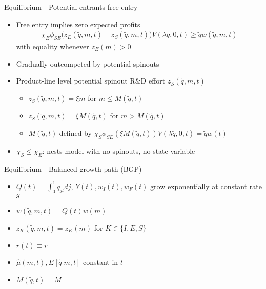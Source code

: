\documentclass[english,usenames,dvipsnames]{beamer}
\begin{document}
\begin{frame}{Equilibrium - Potential entrants free entry}
\begin{itemize}
	\item Free entry implies zero expected profits
	\begin{align*}
		\chi_E \phi_{SE}\Big(z_E(\tilde{q},m,t) + z_S(\tilde{q},m,t)\Big) V(\lambda q,0,t) \ge \tilde{q} w(\tilde{q},m,t)
	\end{align*} 
	with equality whenever $z_E(m) > 0$
	\item Gradually outcompeted by potential spinouts
	\item Product-line level potential spinout R\&D effort $z_S(\tilde{q},m,t)$
	\begin{itemize}
		\item $z_S(\tilde{q},m,t) = \xi m$ for $m \le M(\tilde{q},t)$
		\item $z_S(\tilde{q},m,t) = \xi M(\tilde{q},t)$ for $m > M(\tilde{q},t)$
		\item $M(\tilde{q},t)$ defined by $\chi_S \phi_{SE} (\xi M(\tilde{q},t)) V(\lambda \tilde{q},0,t) = \tilde{q} \bar{w}(t)$
	\end{itemize}
	\item $\chi_S \le \chi_E$: nests model with no spinouts, no state variable
\end{itemize}
\end{frame}

\begin{frame}[label = equilibrium_BGP]{Equilibrium - Balanced growth path (BGP)}
\begin{itemize}
	\item $Q(t) = \int_0^1 q_{jt} dj$, $Y(t),w_I(t),w_F(t)$ grow exponentially at constant rate $g$
	\item $w(\tilde{q},m,t) = Q(t) w(m)$
	\item $z_K(\tilde{q},m,t) = z_K(m)$ for $K \in \{I,E,S\}$
	\item $r(t) \equiv r$
	\item $\hat{\mu}(m,t),E[\tilde{q}|m,t]$ constant in $t$ \hyperlink{BGP_stationary_distribution}{}
	\item $M(\tilde{q},t) = M$ 
\end{itemize}
\end{frame}
\end{document}
